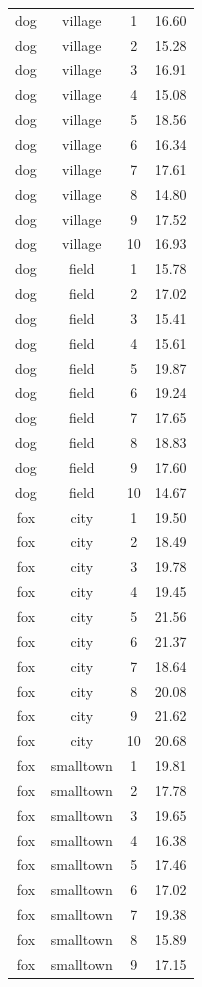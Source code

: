 \documentclass[
  letterpaper,
  DIV=11,
  oneside]{scrreport}
\begin{document}
\begin{longtable}[]{@{}cccc@{}}
dog & village & 1 & 16.60 \\
dog & village & 2 & 15.28 \\
dog & village & 3 & 16.91 \\
dog & village & 4 & 15.08 \\
dog & village & 5 & 18.56 \\
dog & village & 6 & 16.34 \\
dog & village & 7 & 17.61 \\
dog & village & 8 & 14.80 \\
dog & village & 9 & 17.52 \\
dog & village & 10 & 16.93 \\
dog & field & 1 & 15.78 \\
dog & field & 2 & 17.02 \\
dog & field & 3 & 15.41 \\
dog & field & 4 & 15.61 \\
dog & field & 5 & 19.87 \\
dog & field & 6 & 19.24 \\
dog & field & 7 & 17.65 \\
dog & field & 8 & 18.83 \\
dog & field & 9 & 17.60 \\
dog & field & 10 & 14.67 \\
fox & city & 1 & 19.50 \\
fox & city & 2 & 18.49 \\
fox & city & 3 & 19.78 \\
fox & city & 4 & 19.45 \\
fox & city & 5 & 21.56 \\
fox & city & 6 & 21.37 \\
fox & city & 7 & 18.64 \\
fox & city & 8 & 20.08 \\
fox & city & 9 & 21.62 \\
fox & city & 10 & 20.68 \\
fox & smalltown & 1 & 19.81 \\
fox & smalltown & 2 & 17.78 \\
fox & smalltown & 3 & 19.65 \\
fox & smalltown & 4 & 16.38 \\
fox & smalltown & 5 & 17.46 \\
fox & smalltown & 6 & 17.02 \\
fox & smalltown & 7 & 19.38 \\
fox & smalltown & 8 & 15.89 \\
fox & smalltown & 9 & 17.15 \\

\end{longtable}
\end{document}
